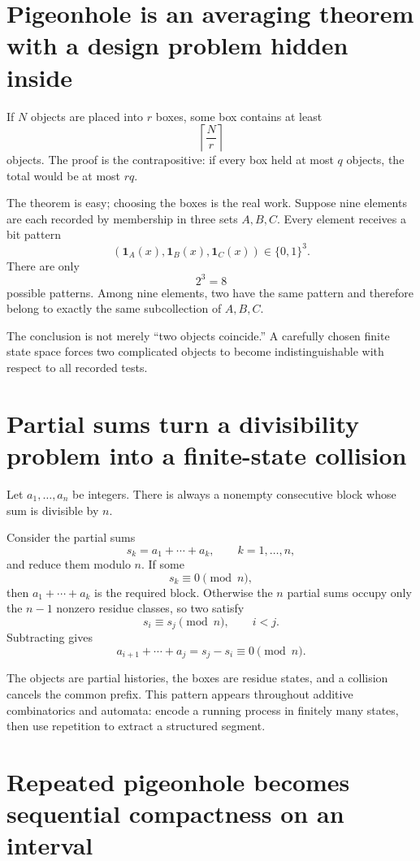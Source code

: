 
\section{Pigeonhole is an averaging theorem with a design problem hidden inside}

If \(N\) objects are placed into \(r\) boxes, some box contains at least
\[
  \left\lceil\frac Nr\right\rceil
\]
objects.  The proof is the contrapositive: if every box held at most \(q\) objects, the total would be at most \(rq\).

The theorem is easy; choosing the boxes is the real work.  Suppose nine elements are each recorded by membership in three sets \(A,B,C\).  Every element receives a bit pattern
\[
  (\mathbf1_A(x),\mathbf1_B(x),\mathbf1_C(x))
  \in\{0,1\}^3.
\]
There are only
\[
  2^3=8
\]
possible patterns.  Among nine elements, two have the same pattern and therefore belong to exactly the same subcollection of \(A,B,C\).

The conclusion is not merely “two objects coincide.”  A carefully chosen finite state space forces two complicated objects to become indistinguishable with respect to all recorded tests.

\section{Partial sums turn a divisibility problem into a finite-state collision}

Let \(a_1,\ldots,a_n\) be integers.  There is always a nonempty consecutive block whose sum is divisible by \(n\).

Consider the partial sums
\[
  s_k=a_1+\cdots+a_k,
  \qquad k=1,\ldots,n,
\]
and reduce them modulo \(n\).  If some
\[
  s_k\equiv0\pmod n,
\]
then \(a_1+\cdots+a_k\) is the required block.  Otherwise the \(n\) partial sums occupy only the \(n-1\) nonzero residue classes, so two satisfy
\[
  s_i\equiv s_j\pmod n,
  \qquad i<j.
\]
Subtracting gives
\[
  a_{i+1}+\cdots+a_j
  =s_j-s_i
  \equiv0\pmod n.
\]

The objects are partial histories, the boxes are residue states, and a collision cancels the common prefix.  This pattern appears throughout additive combinatorics and automata: encode a running process in finitely many states, then use repetition to extract a structured segment.

\section{Repeated pigeonhole becomes sequential compactness on an interval}

